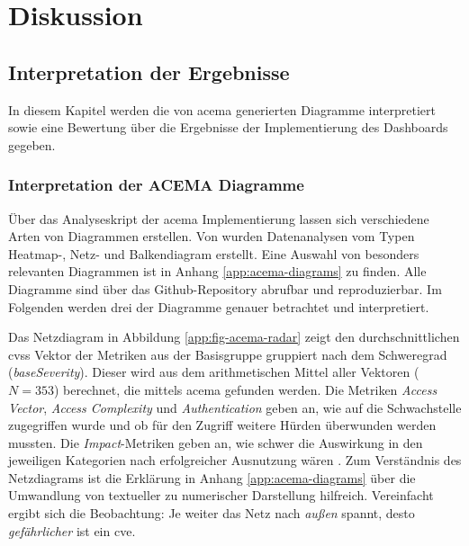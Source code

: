\chapter{Diskussion}
\label{chap:diskussion}
\section{Interpretation der Ergebnisse}
\label{sec:interpretation}
In diesem Kapitel werden die von \gls{acema} generierten Diagramme interpretiert sowie eine Bewertung über die Ergebnisse der Implementierung des Dashboards gegeben.
\subsection{Interpretation der ACEMA Diagramme}
\label{sec:interpretation-acema}
Über das Analyseskript der \gls{acema} Implementierung lassen sich verschiedene Arten von Diagrammen erstellen. Von \citeauthor{klementSecuring6GTransition2024} wurden Datenanalysen vom Typen Heatmap-, Netz- und Balkendiagram erstellt. Eine Auswahl von besonders relevanten Diagrammen ist in Anhang \ref{app:acema-diagrams} zu finden. Alle Diagramme sind über das Github-Repository \autocite{jesseDumpeldownAcema_oranDev} abrufbar und reproduzierbar. Im Folgenden werden drei der Diagramme genauer betrachtet und interpretiert.
\par Das Netzdiagram in Abbildung \ref{app:fig-acema-radar} zeigt den durchschnittlichen \gls{cvss} Vektor der Metriken aus der Basisgruppe gruppiert nach dem Schweregrad (\textit{baseSeverity}). Dieser wird aus dem arithmetischen Mittel aller Vektoren (\(N = 353\)) berechnet, die mittels \gls{acema} gefunden werden. Die Metriken \textit{Access Vector}, \textit{Access Complexity} und \textit{Authentication} geben an, wie auf die Schwachstelle zugegriffen wurde und ob für den Zugriff weitere Hürden überwunden werden mussten. Die \textit{Impact}-Metriken geben an, wie schwer die Auswirkung in den jeweiligen Kategorien nach erfolgreicher Ausnutzung wären \autocite{CVSSV2Complete}. Zum Verständnis des Netzdiagrams ist die Erklärung in Anhang \ref{app:acema-diagrams} über die Umwandlung von textueller zu numerischer Darstellung hilfreich. Vereinfacht ergibt sich die Beobachtung: Je weiter das Netz nach \textit{außen} spannt, desto \textit{gefährlicher} ist ein \gls{cve}.
